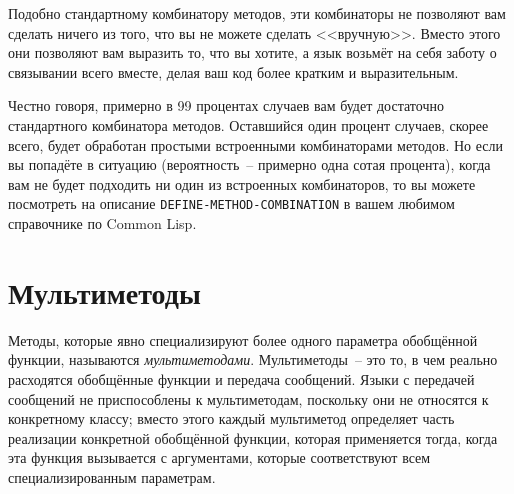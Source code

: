 Подобно стандартному комбинатору методов, эти комбинаторы не позволяют вам сделать ничего
из того, что вы не можете сделать <<вручную>>.  Вместо этого они позволяют вам выразить то,
что вы хотите, а язык возьмёт на себя заботу о связывании всего вместе, делая ваш код
более кратким и выразительным.

Честно говоря, примерно в 99 процентах случаев вам будет достаточно стандартного
комбинатора методов.  Оставшийся один процент случаев, скорее всего, будет обработан
простыми встроенными комбинаторами методов.  Но если вы попадёте в ситуацию
(вероятность~-- примерно одна сотая процента), когда вам не будет подходить ни один из
встроенных комбинаторов, то вы можете посмотреть на описание
\lstinline{DEFINE-METHOD-COMBINATION} в вашем любимом справочнике по Common Lisp.

\section{Мультиметоды}

Методы, которые явно специализируют более одного параметра обобщённой функции, называются
\textit{мультиметодами}.  Мультиметоды~-- это то, в чем реально расходятся обобщённые
функции и передача сообщений.  Языки с передачей сообщений не приспособлены к
мультиметодам, поскольку они не относятся к конкретному классу; вместо этого каждый
мультиметод определяет часть реализации конкретной обобщённой функции, которая применяется
тогда, когда эта функция вызывается с аргументами, которые соответствуют всем
специализированным параметрам.

